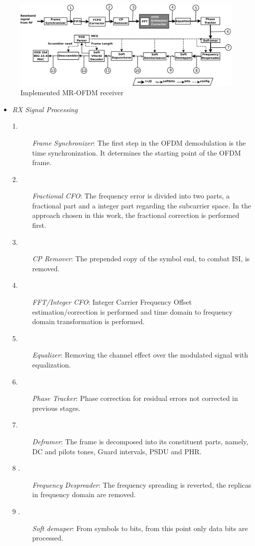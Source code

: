 \begin{figure}[hbt]
  \centering
    \includegraphics[width=1\textwidth]
      {./figures/OFDM_RX_V7_d}
  \caption{Implemented MR-OFDM receiver}
  \label{fig:ofdm_rx}
\end{figure}

\begin{itemize}
\item \emph{RX Signal Processing}

\begin{description}
\item [1. ] \emph{Frame Synchronizer}: The first step in the OFDM demodulation is the time synchronization. It determines the starting point of the OFDM frame.  
\item [2.] \emph{Fractional CFO}: The frequency error is divided into two parts, a fractional part and a integer part regarding the subcarrier space. In the approach chosen in this work, the fractional correction is performed first. 
\item [3. ] \emph{CP Remover}:  The prepended copy of the symbol end, to combat ISI, is removed.
\item [4. ] \emph{FFT/Integer CFO}: Integer Carrier Frequency Offset estimation/correction is performed and time domain to frequency domain transformation is performed.  
\item [5. ] \emph{Equalizer}: Removing the channel effect over the modulated signal with equalization. 
\item [6. ] \emph{Phase Tracker}: Phase correction for residual errors not corrected in previous stages.    
\item [7. ] \emph{Deframer}: The frame is decomposed into its constituent parts, namely, DC and pilots tones,  Guard intervals, PSDU and PHR.
\item [8 .] \emph{Frequency Despreader}: The frequency spreading is reverted, the replicas in frequency domain are removed. 
\item [9 .] \emph{Soft demaper}: From symbols to bits, from this point only data bits are processed.
\end{description}


\end{itemize}
